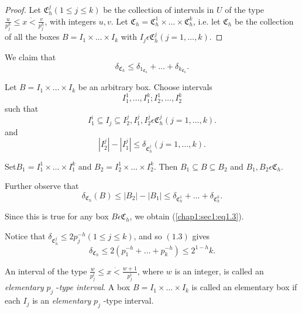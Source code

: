 \begin{proof}
 Let $\mathfrak{C}_{h}^{j} (1 \leq j \leq k)$ be the collection of intervals in $U$ of the type $\frac{u}{p_{j}^{h}} \leq x \dot{<} \frac{v}{p_{j}^{h}}$, with integers $u, v$. Let $\mathfrak{C}_{h} = \mathfrak{C}_{h}^{1} \times  \ldots \times  \mathfrak{C}_{h}^{k}$, i.e. let $\mathfrak{C}_{h}$ be the collection of all the boxes $B = I_{1} \times \ldots \times I_{k}$ with $I_{j} \epsilon \mathfrak{C}_{h}^{j} (j = 1, \ldots , k)$.
\end{proof}

We claim that
\begin{equation*}
 \delta_{\mathfrak{C}_{h}} \leq \delta_{1_{\mathfrak{C}_{h}}} + \ldots + \delta_{k_{\mathfrak{C}_{h}}}.\tag{1.3}\label{chap1:sec1:eq1.3}
\end{equation*}

Let $B = I_{1} \times \ldots \times I_{k}$ be an arbitrary box. Choose intervals
$$
I_{1}^{1}, \ldots, I_{1}^{k} ; I_{2}^{1}, \ldots, I_{2}^{k}
$$
such that
$$
I_{1}^{i} \subseteq I_{j} \subseteq I_{2}^{j}, I_{1}^{j}, I_{2}^{j} \epsilon \mathfrak{C}_{h}^{j} (j = 1, \ldots , k).
$$
and
$$
|I_{2}^{j}|-|I_{1}^{j}| \leq \delta_{\mathfrak{C}_{h}^{j}} (j = 1, \ldots, k).
$$

Set\pageoriginale $B_{1} = I_{1}^{1} \times \ldots \times I_{1}^{k}$ and $B_{2} = I_{2}^{1} \times \ldots \times I_{2}^{k}$. Then $B_{1} \subseteq B \subseteq B_{2}$ and $B_{1}, B_{2} \epsilon \mathfrak{C}_{h}$. 

Further observe that
$$
\delta_{\mathfrak{C}_{h}} (B) \leq |B_{2}| - |B_{1}| \leq \delta_{\mathfrak{C}_{h}^{1}} + \ldots + \delta_{\mathfrak{C}_{h}^{k}}.
$$ 

Since this is true for any box $B \epsilon \mathfrak{C}_{h}$, we obtain (\ref{chap1:sec1:eq1.3}).

Notice that $\delta_{\mathfrak{C}_{h}^{j}} \leq 2p_{j}^{-h} (1 \leq j \leq k)$, and so $(1.3)$ gives
\begin{equation*}
 \delta_{\mathfrak{C}_{h}} \leq 2(p_{1}^{-h} + \ldots + p_{k}^{-h}) \leq 2^{1-h} k.\tag{1.4}\label{chap1:sec1:eq1.4}
\end{equation*}

An interval of the type $\frac{w}{p_{j}^{t}} \leq x \dot{<} \frac{w+1}{p_{j}^{t}}$, where $w$ is an integer, is called an {\em elementary} $p_{j}$ -{\em type interval}. A box $B = I_{1} \times \ldots \times I_{k}$ is called an elementary box if each $I_{j}$ is an {\em elementary} $p_{j}$ -type interval.

